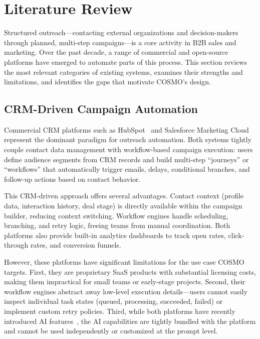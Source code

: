 \section{Literature Review}

Structured outreach---contacting external organizations and decision-makers through planned, multi-step campaigns---is a core activity in B2B sales and marketing. Over the past decade, a range of commercial and open-source platforms have emerged to automate parts of this process. This section reviews the most relevant categories of existing systems, examines their strengths and limitations, and identifies the gaps that motivate COSMO's design.

\subsection{CRM-Driven Campaign Automation}

Commercial CRM platforms such as HubSpot~\cite{hubspot_marketing_automation} and Salesforce Marketing Cloud~\cite{salesforce_journey_builder_pdf} represent the dominant paradigm for outreach automation. Both systems tightly couple contact data management with workflow-based campaign execution: users define audience segments from CRM records and build multi-step ``journeys'' or ``workflows'' that automatically trigger emails, delays, conditional branches, and follow-up actions based on contact behavior.

This CRM-driven approach offers several advantages. Contact context (profile data, interaction history, deal stage) is directly available within the campaign builder, reducing context switching. Workflow engines handle scheduling, branching, and retry logic, freeing teams from manual coordination. Both platforms also provide built-in analytics dashboards to track open rates, click-through rates, and conversion funnels.

However, these platforms have significant limitations for the use case COSMO targets. First, they are proprietary SaaS products with substantial licensing costs, making them impractical for small teams or early-stage projects. Second, their workflow engines abstract away low-level execution details---users cannot easily inspect individual task states (queued, processing, succeeded, failed) or implement custom retry policies. Third, while both platforms have recently introduced AI features~\cite{hubspot_ai_email_creation, salesforce_einstein_gpt_sales_emails}, the AI capabilities are tightly bundled with the platform and cannot be used independently or customized at the prompt level.

